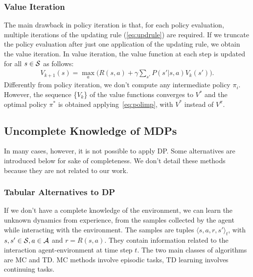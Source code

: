 \subsubsection{Value Iteration} \label{subsec:vi}
The main drawback in policy iteration is that, for each policy evaluation, multiple iterations of the updating rule (\ref{eq:updrule}) are required. If we truncate the policy evaluation after just one application of the updating rule, we obtain the value iteration. In value iteration, the value function at each step is updated for all $s \in \mathcal{S}$ as follows:
\begin{align} V_{k+1}(s) = \max_a \Big( R(s,a) + \gamma \sum_{s'}P(s'|s,a)  V_{k}(s') \Big). \end{align}
Differently from policy iteration, we don't compute any intermediate policy $\pi_i$. However, the sequence \{$V_{k}$\} of the value functions converges to $V^{*}$  and the optimal policy $\pi^{*}$ is obtained applying~\eqref{eq:polimp}, with $V^{*}$ instead of $V^{\pi}$.

\subsection{Uncomplete Knowledge of \ac{MDPs}}
In many cases, however, it is not possible to apply \ac{DP}. Some alternatives are introduced below for sake of completeness. We don't detail these methods because they are not related to our work.  

\subsubsection{Tabular Alternatives to \ac{DP}}\label{subsec:alt}
If we don't have a complete knowledge of the environment, we can learn the unknown dynamics from experience, \ie from the samples collected by the agent while interacting with the environment. The samples are tuples $\langle s,a,r,s' \rangle_t$, with $s, s' \in \mathcal{S}, a \in \mathcal{A}$ and $r = R(s,a)$. They contain information related to the interaction agent-environment at time step $t$. The two main classes of algorithms are \acf{MC} and \acf{TD}. \ac{MC} methods involve episodic tasks, \ac{TD} learning involves continuing tasks. 

